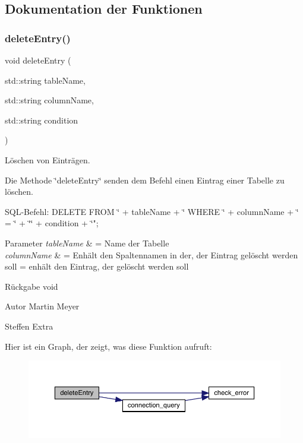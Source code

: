 \subsection{Dokumentation der Funktionen}
\mbox{\label{entry_8cpp_a1ea4c59c6377c754fd0264b58f476685}} 
\subsubsection{delete\+Entry()}
{\footnotesize\ttfamily void delete\+Entry (\begin{DoxyParamCaption}\item[{std\+::string}]{table\+Name,  }\item[{std\+::string}]{column\+Name,  }\item[{std\+::string}]{condition }\end{DoxyParamCaption})}



Löschen von Einträgen. 

Die Methode \char`\"{}delete\+Entry\char`\"{} senden dem Befehl einen Eintrag einer Tabelle zu löschen.~\newline


S\+Q\+L-\/\+Befehl\+: D\+E\+L\+E\+TE F\+R\+OM \char`\"{} + table\+Name + \char`\"{} W\+H\+E\+RE \char`\"{} + column\+Name + \char`\"{} = \char`\"{} + \char`\"{}\textquotesingle{}\char`\"{} + condition + \char`\"{}\textquotesingle{}";


\begin{DoxyParams}{Parameter}
{\em table\+Name} & = Name der Tabelle \\
\hline
{\em column\+Name} & = Enhält den Spaltennamen in der, der Eintrag gelöscht werden soll  = enhält den Eintrag, der gelöscht werden soll\\
\hline
\end{DoxyParams}
\begin{DoxyReturn}{Rückgabe}
void
\end{DoxyReturn}
\begin{DoxyAuthor}{Autor}
Martin Meyer 

Steffen Extra 
\end{DoxyAuthor}
Hier ist ein Graph, der zeigt, was diese Funktion aufruft\+:\nopagebreak
\begin{figure}[H]
\begin{center}
\leavevmode
\includegraphics[width=350pt]{entry_8cpp_a1ea4c59c6377c754fd0264b58f476685_cgraph}
\end{center}
\end{figure}
\mbox{\label{entry_8cpp_ab254b5514a4950c7479bc4d513c438dc}} 
